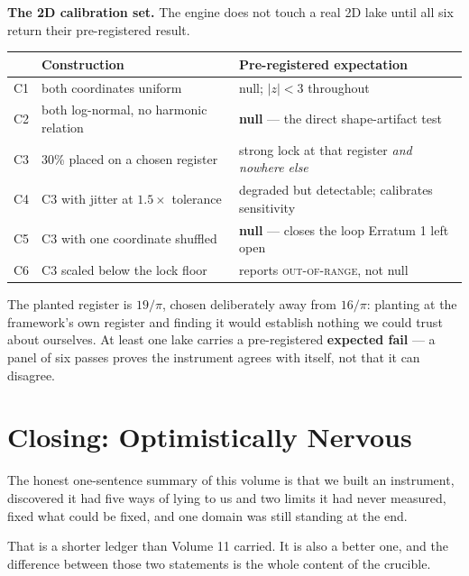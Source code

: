 \documentclass[11pt, letterpaper, openany]{book}
\begin{document}
\begin{predictionbox}
\textbf{The 2D calibration set.} The engine does not touch a real 2D lake until all six return
their pre-registered result.

\medskip
\begin{tabular}{@{}llp{}@{}}
\toprule
& \textbf{Construction} & \textbf{Pre-registered expectation} \\
\midrule
C1 & both coordinates uniform & null; $|z| < 3$ throughout \\
C2 & both log-normal, no harmonic relation & \textbf{null} --- the direct shape-artifact test \\
C3 & 30\% placed on a chosen register & strong lock at that register \emph{and nowhere else} \\
C4 & C3 with jitter at $1.5\times$ tolerance & degraded but detectable; calibrates sensitivity \\
C5 & C3 with one coordinate shuffled & \textbf{null} --- closes the loop Erratum 1 left open \\
C6 & C3 scaled below the lock floor & reports \textsc{out-of-range}, not null \\
\bottomrule
\end{tabular}

\medskip
\noindent The planted register is $19/\pi$, chosen deliberately away from $16/\pi$: planting at
the framework's own register and finding it would establish nothing we could trust about
ourselves. At least one lake carries a pre-registered \textbf{expected fail} --- a panel of six
passes proves the instrument agrees with itself, not that it can disagree.
\end{predictionbox}

\section{Closing: Optimistically Nervous}

The honest one-sentence summary of this volume is that we built an instrument, discovered it had
five ways of lying to us and two limits it had never measured, fixed what could be fixed, and
one domain was still standing at the end.

That is a shorter ledger than Volume 11 carried. It is also a better one, and the difference
between those two statements is the whole content of the crucible.
\end{document}

